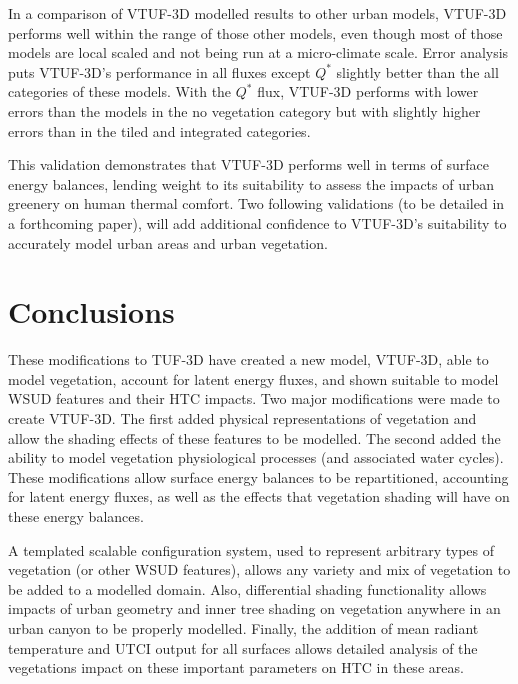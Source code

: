 \documentclass[final,3p,times,authoryear]{elsarticle}
\begin{document}
In a comparison of VTUF-3D modelled results to other urban models, VTUF-3D performs well within the range of those other models, even though most of those models are local scaled and not being run at a micro-climate scale. Error analysis puts VTUF-3D's performance in all fluxes except $Q^{*}$ slightly better than the all categories of these models. With the $Q^{*}$ flux, VTUF-3D performs with lower errors than the models in the no vegetation category but with slightly higher errors than in the tiled and integrated categories. 

This validation demonstrates that VTUF-3D performs well in terms of surface energy balances, lending weight to its suitability to assess the impacts of urban greenery on human thermal comfort. Two following validations (to be detailed in a forthcoming paper), will add additional confidence to VTUF-3D's suitability to accurately model urban areas and urban vegetation.














\section{Conclusions} \label{sec:DesignConc} 

These modifications to TUF-3D have created a new model, VTUF-3D, able to model vegetation, account for latent energy fluxes, and shown suitable to model WSUD features and their HTC impacts. Two major modifications were made to create VTUF-3D. The first added physical representations of vegetation and allow the shading effects of these features to be modelled. The second added the ability to model vegetation physiological processes (and associated water cycles). These modifications allow surface energy balances to be repartitioned, accounting for latent energy fluxes, as well as the effects that vegetation shading will have on these energy balances. 

A templated scalable configuration system, used to represent arbitrary types of vegetation (or other WSUD features), allows any variety and mix of vegetation to be added to a modelled domain. Also, differential shading functionality allows impacts of urban geometry and inner tree shading on vegetation anywhere in an urban canyon to be properly modelled. Finally, the addition of mean radiant temperature and UTCI output for all surfaces allows detailed analysis of the vegetations impact on these important parameters on HTC in these areas.
\end{document}
